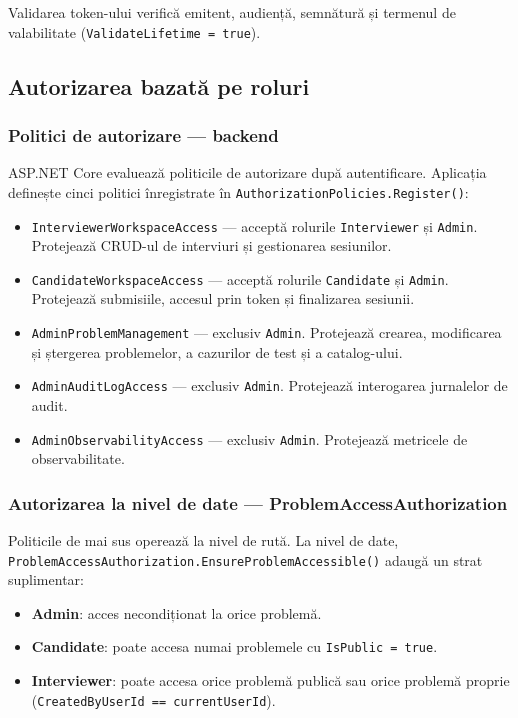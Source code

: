 Validarea token-ului verifică emitent, audiență, semnătură și termenul de
valabilitate (\texttt{ValidateLifetime = true}).

\subsection{Autorizarea bazată pe roluri}

\subsubsection{Politici de autorizare — backend}

ASP.NET Core evaluează politicile de autorizare după autentificare.
Aplicația definește cinci politici înregistrate în
\texttt{AuthorizationPolicies.Register()}:

\begin{itemize}
  \item \texttt{InterviewerWorkspaceAccess} — acceptă rolurile
        \texttt{Interviewer} și \texttt{Admin}.
        Protejează CRUD-ul de interviuri și gestionarea sesiunilor.
  \item \texttt{CandidateWorkspaceAccess} — acceptă rolurile
        \texttt{Candidate} și \texttt{Admin}.
        Protejează submisiile, accesul prin token și finalizarea sesiunii.
  \item \texttt{AdminProblemManagement} — exclusiv \texttt{Admin}.
        Protejează crearea, modificarea și ștergerea problemelor, a
        cazurilor de test și a catalog-ului.
  \item \texttt{AdminAuditLogAccess} — exclusiv \texttt{Admin}.
        Protejează interogarea jurnalelor de audit.
  \item \texttt{AdminObservabilityAccess} — exclusiv \texttt{Admin}.
        Protejează metricele de observabilitate.
\end{itemize}

\subsubsection{Autorizarea la nivel de date — ProblemAccessAuthorization}

Politicile de mai sus operează la nivel de rută. La nivel de date,
\texttt{ProblemAccessAuthorization.EnsureProblemAccessible()} adaugă un
strat suplimentar:

\begin{itemize}
  \item \textbf{Admin}: acces necondiționat la orice problemă.
  \item \textbf{Candidate}: poate accesa numai problemele cu
        \texttt{IsPublic = true}.
  \item \textbf{Interviewer}: poate accesa orice problemă publică sau
        orice problemă proprie (\texttt{CreatedByUserId == currentUserId}).
\end{itemize}

